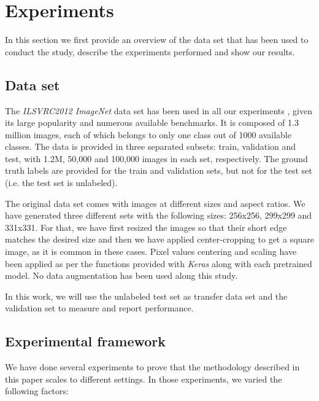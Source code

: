 \documentclass{elsarticle}
\begin{document}
	\section{Experiments} \label{sec:experiments}
	In this section we first provide an overview of the data set that has been used to conduct the study, describe the experiments performed and show our results.
	
	\subsection{Data set}
	The \textit{ILSVRC2012 ImageNet} data set has been used in all our experiments \citep{ILSVRC15}, given its large popularity and numerous available benchmarks. It is composed of 1.3 million images,  each of which belongs to only one class out of 1000 available classes. The data is provided in three separated subsets: train, validation and test, with 1.2M, 50,000 and 100,000 images in each set, respectively. The ground truth labels are provided for the train and validation sets, but not for the test set (i.e. the test set is unlabeled).
	
	The original data set comes with images at different sizes and aspect ratios. We have generated three different sets with the following sizes: 256x256, 299x299 and 331x331. For that, we have first resized the images so that their short edge matches the desired size and then we have applied center-cropping to get a square image, as it is common in these cases. Pixel values centering and scaling have been applied as per the functions provided with \textit{Keras} along with each pretrained model. No data augmentation has been used along this study.
	
	In this work, we will use the unlabeled test set as transfer data set and the validation set to measure and report performance. 
	
	\subsection{Experimental framework}
	We have done several experiments to prove that the methodology described in this paper scales to different settings. In those experiments, we varied the following factors:
	
\end{document}
